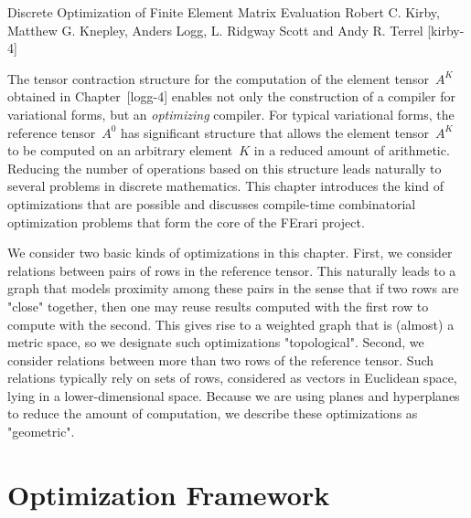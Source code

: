               {Discrete Optimization of Finite Element Matrix Evaluation}
              {Robert C. Kirby, Matthew G. Knepley, Anders Logg, L. Ridgway Scott and Andy R. Terrel}
              {[kirby-4]}

\vspace{-0.5cm}

The tensor contraction structure for the computation of the element
tensor~$A^K$ obtained in Chapter~[logg-4] enables not only the
construction of a compiler for variational forms, but an
\emph{optimizing} compiler. For typical variational forms, the
reference tensor~$A^0$ has significant structure that allows the
element tensor~$A^K$ to be computed on an arbitrary element~$K$ in a
reduced amount of arithmetic. Reducing the number of operations based
on this structure leads naturally to several problems in discrete
mathematics.  This chapter introduces the kind of optimizations that
are possible and discusses compile-time combinatorial optimization
problems that form the core of the FErari
project.~\cite{KirbyLoggScottEtAl2006,KirbyScott2007,KirbyLogg2008,www:ferari}

We consider two basic kinds of optimizations in this chapter. First,
we consider relations between pairs of rows in the reference tensor.
This naturally leads to a graph that models proximity among these
pairs in the sense that if two rows are "close" together, then one may
reuse results computed with the first row to compute with the second.
This gives rise to a weighted graph that is (almost) a metric space,
so we designate such optimizations "topological". Second, we consider
relations between more than two rows of the reference tensor. Such
relations typically rely on sets of rows, considered as vectors in
Euclidean space, lying in a lower-dimensional space. Because we are
using planes and hyperplanes to reduce the amount of computation, we
describe these optimizations as "geometric".

\section{Optimization Framework}

